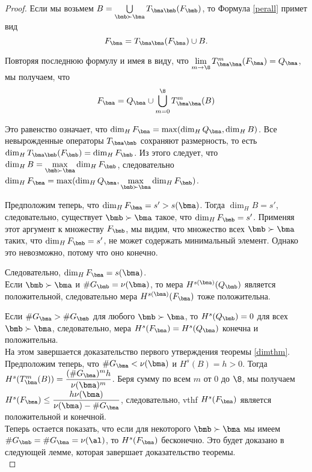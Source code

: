 \begin{proof}
Если мы возьмем $B=\bigcup\limits_{\bmb\succ\bma}T_{\bma\bmb}(F_\bmb)$, то Формула \eqref{perall} примет вид 
\begin{equation}
F_\bma=T_{\bma\bma}(F_\bma)\cup B.
\end{equation}

Повторяя последнюю формулу и имея в виду, что $\lim\limits_{m\to\8}T^m_{\bma\bma}(F_\bma)=Q_\bma$, мы получаем, что
\begin{equation}\label{FviaB}
F_\bma=Q_\bma\cup \bigcup\limits_{m=0}^\8T_{\bma\bma}^m(B)   
\end{equation}

Это равенство означает, что $\dim_HF_\bma=\max(\dim_HQ_\bma,\dim_HB)$.
Все невырожденные операторы $T_{\bma\bmb}$ сохраняют размерность, то есть $\dim_H T_{\bma\bmb}(F_\bmb)=\dim_H F_\bmb$. 
Из этого следует, что
$\dim_HB=\max\limits_{\bmb\succ\bma}\dim_HF_\bmb$, следовательно 
$\dim_HF_\bma=\max(\dim_HQ_\bma,\max\limits_{\bmb\succ\bma}\dim_HF_\bmb)$.

Предположим теперь, что $\dim_HF_\bma=s'>s(\bma)$.
Тогда $\dim_HB = s'$, следовательно, существует $\bmb\succ\bma$ такое, что $\dim_HF_\bmb=s'$.
Применяя этот аргумент к множеству $F_\bmb$, мы видим, что множество всех $\bmb\succ\bma$ таких, что $\dim_HF_\bmb=s'$, не может содержать минимальный элемент.
Однако это невозможно, потому что оно конечно.

Следовательно, $\dim_HF_\bma=s(\bma)$. \\

Если $\bmb\succ\bma$ и $\#G_\bmb=\nu(\bma)$, то
мера $H^{s(\bma)}(Q_\bmb)$ является положительной, следовательно мера $H^{s(\bma)}(F_\bma)$ тоже положительна.

Если $\#G_\bma>\#G_\bmb$ для любого $\bmb\succ\bma$, то $H^s(Q_\bmb)=0$ для всех
$\bmb\succ\bma$, следовательно, мера $H^s (F_\bma)=H^s (Q_\bma)$ конечна и положительна.\\
На этом завершается доказательство первого утверждения теоремы \ref{dimthm}.\\

Предположим теперь, что $\#G_\bma<\nu(\bma)$ и $H^s(B)=h>0$.
Тогда $H^s(T^m_\bma(B))=\dfrac{(\#G_\bma)^m h}{\nu(\bma)^m}$.
Беря сумму по всем $m$ от $0$ до $\8$, мы получаем $H^s(F_\bma)\leq \dfrac{h\nu(\bma)}{\nu(\bma)-\#G_\bma}$, следовательно, vthf $H^s(F_\bma)$ является положительной и конечной.\\

Теперь остается показать, что если для некоторого $\bmb\succ\bma$ мы имеем $\#G_\bmb=\#G_\bma=\nu(\al)$, то $H^s(F_\bma)$ бесконечно.
Это будет доказано в следующей лемме, которая завершает доказательство теоремы.\\
\end{proof}

